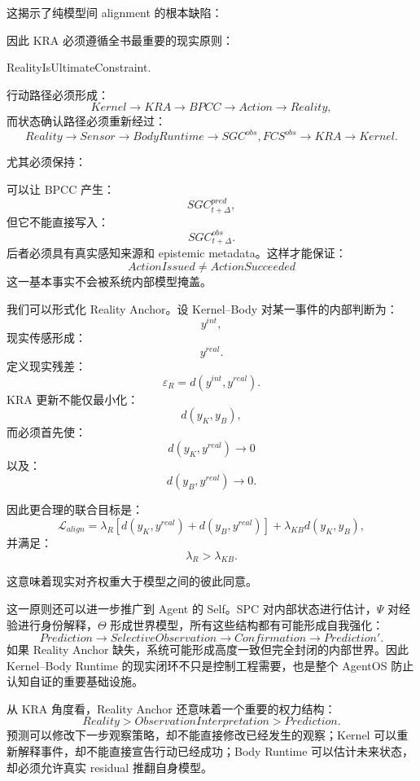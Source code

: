 这揭示了纯模型间 alignment 的根本缺陷：
\begin{statementbox}
\centering
{}
\end{statementbox}

因此 KRA 必须遵循全书最重要的现实原则：
\begin{statementbox}
RealityIsUltimateConstraint.
\end{statementbox}

行动路径必须形成：
\[
Kernel
\rightarrow
KRA
\rightarrow
BPCC
\rightarrow
Action
\rightarrow
Reality,
\]
而状态确认路径必须重新经过：
\[
Reality
\rightarrow
Sensor
\rightarrow
BodyRuntime
\rightarrow
SGC^{obs},FCS^{obs}
\rightarrow
KRA
\rightarrow
Kernel.
\]

尤其必须保持：
\begin{statementbox}
\centering
{}
\end{statementbox}

可以让 BPCC 产生：
\[
SGC^{pred}_{t+\Delta},
\]
但它不能直接写入：
\[
SGC^{obs}_{t+\Delta}.
\]
后者必须具有真实感知来源和 epistemic metadata。这样才能保证：
\[
ActionIssued
\neq
ActionSucceeded
\]
这一基本事实不会被系统内部模型掩盖。

我们可以形式化 Reality Anchor。设 Kernel--Body 对某一事件的内部判断为：
\[
y^{int},
\]
现实传感形成：
\[
y^{real}.
\]
定义现实残差：
\[
\varepsilon_R
=
d(
y^{int},
y^{real}
).
\]
KRA 更新不能仅最小化：
\[
d(
y_K,
y_B
),
\]
而必须首先使：
\[
\boxed{
d(
y_K,
y^{real}
)
\rightarrow0
}
\]
以及：
\[
\boxed{
d(
y_B,
y^{real}
)
\rightarrow0.
}
\]

因此更合理的联合目标是：
\[
\mathcal L_{align}
=
\lambda_R
\left[
d(y_K,y^{real})
+
d(y_B,y^{real})
\right]
+
\lambda_{KB}d(y_K,y_B),
\]
并满足：
\[
\boxed{
\lambda_R>\lambda_{KB}.
}
\]

这意味着现实对齐权重大于模型之间的彼此同意。

这一原则还可以进一步推广到 Agent 的 Self。SPC 对内部状态进行估计，$\Psi$ 对经验进行身份解释，$\Theta$ 形成世界模型，所有这些结构都有可能形成自我强化：
\[
Prediction
\rightarrow
SelectiveObservation
\rightarrow
Confirmation
\rightarrow
Prediction'.
\]
如果 Reality Anchor 缺失，系统可能形成高度一致但完全封闭的内部世界。因此 Kernel--Body Runtime 的现实闭环不只是控制工程需要，也是整个 AgentOS 防止认知自证的重要基础设施。

从 KRA 角度看，Reality Anchor 还意味着一个重要的权力结构：
\[
Reality
>
ObservationInterpretation
>
Prediction.
\]
预测可以修改下一步观察策略，却不能直接修改已经发生的观察；Kernel 可以重新解释事件，却不能直接宣告行动已经成功；Body Runtime 可以估计未来状态，却必须允许真实 residual 推翻自身模型。

